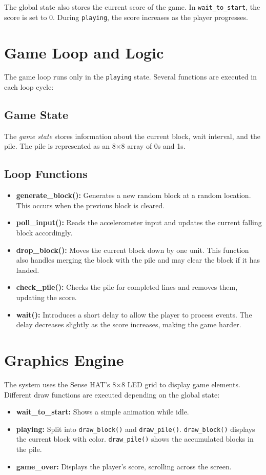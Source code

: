 \documentclass[11pt,titlepage,openright]{book}
\begin{document}
The global state also stores the current score of the game. In \texttt{wait\_to\_start}, the score is set to 0. During \texttt{playing}, the score increases as the player progresses.

\section{Game Loop and Logic}
The game loop runs only in the \texttt{playing} state. Several functions are executed in each loop cycle:

\subsection{Game State}
The \textit{game state} stores information about the current block, wait interval, and the pile. The pile is represented as an 8$\times$8 array of 0s and 1s.

\subsection{Loop Functions}
\begin{itemize}
    \item \textbf{generate\_block():} Generates a new random block at a random location. This occurs when the previous block is cleared.
    \item \textbf{poll\_input():} Reads the accelerometer input and updates the current falling block accordingly.
    \item \textbf{drop\_block():} Moves the current block down by one unit. This function also handles merging the block with the pile and may clear the block if it has landed.
    \item \textbf{check\_pile():} Checks the pile for completed lines and removes them, updating the score.
    \item \textbf{wait():} Introduces a short delay to allow the player to process events. The delay decreases slightly as the score increases, making the game harder.
\end{itemize}

\section{Graphics Engine}
The system uses the Sense HAT’s 8$\times$8 LED grid to display game elements. Different draw functions are executed depending on the global state:

\begin{itemize}
    \item \textbf{wait\_to\_start:} Shows a simple animation while idle.
    \item \textbf{playing:} Split into \texttt{draw\_block()} and \texttt{draw\_pile()}. \texttt{draw\_block()} displays the current block with color. \texttt{draw\_pile()} shows the accumulated blocks in the pile.
    \item \textbf{game\_over:} Displays the player’s score, scrolling across the screen.
\end{itemize}
\end{document}
